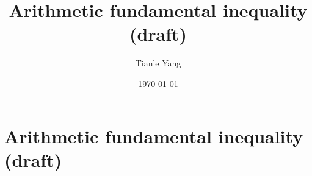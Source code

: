 \documentclass{noteformyself}
\title{Arithmetic fundamental inequality (draft)}
\author{Tianle Yang}
\date{\today}
\begin{document}
    \maketitle

    \section{Arithmetic fundamental inequality (draft)}



\end{document}

